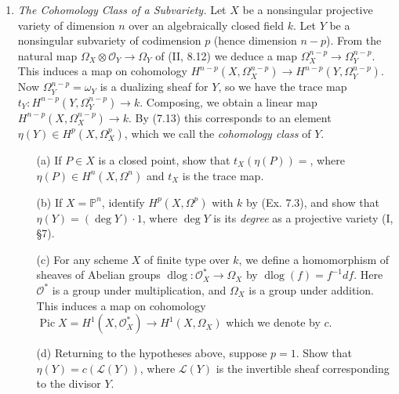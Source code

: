 \documentclass{article}
\newcommand{\fO}{\mathscr{O}}
\newcommand{\fL}{\mathscr{L}}
\newcommand{\PP}{\mathbb{P}}
\DeclareMathOperator{\pic}{Pic}
\DeclareMathOperator{\dlog}{dlog}
\begin{document}
\begin{enumerate} [label=\textbf{\arabic*.}, leftmargin=0em]
\item \textit{The Cohomology Class of a Subvariety.} Let $X$ be a nonsingular projective variety of dimension $n$ over an algebraically closed field $k$. Let $Y$ be a nonsingular subvariety of codimension $p$ (hence dimension $n - p$). From the natural map $\Omega_X \otimes \fO_Y \to \Omega_Y$ of (II, 8.12) we deduce a map $\Omega_X^{n - p} \to \Omega_Y^{n - p}$. This induces a map on cohomology $H^{n - p}(X, \Omega_X^{n - p}) \to H^{n - p}(Y, \Omega_Y^{n - p})$. Now $\Omega_Y^{n - p} = \omega_Y$ is a dualizing sheaf for $Y$, so we have the trace map $t_Y : H^{n - p}(Y, \Omega_Y^{n - p}) \to k$. Composing, we obtain a linear map $H^{n - p}(X, \Omega_X^{n - p}) \to k$. By (7.13) this corresponds to an element $\eta(Y) \in H^p(X, \Omega_X^p)$, which we call the \textit{cohomology class} of $Y$.
\begin{itemize}
  \item[(a)] If $P \in X$ is a closed point, show that $t_X(\eta(P)) = $, where $\eta(P) \in H^n(X, \Omega^n)$ and $t_X$ is the trace map.
  \item[(b)] If $X = \PP^n$, identify $H^p(X, \Omega^p)$ with $k$ by (Ex. 7.3), and show that $\eta(Y) = (\deg Y) \cdot 1$, where $\deg Y$ is its \textit{degree} as a projective variety (I, \S 7).
  \item[(c)] For any scheme $X$ of finite type over $k$, we define a homomorphism of sheaves of Abelian groups $\dlog : \fO_X^* \to \Omega_X$ by $\dlog(f) = f^{-1} df$. Here $\fO^*$ is a group under multiplication, and $\Omega_X$ is a group under addition. This induces a map on cohomology $\pic{X} = H^1(X, \fO_X^*) \to H^1(X, \Omega_X)$ which we denote by $c$.
  \item[(d)] Returning to the hypotheses above, suppose $p = 1$. Show that $\eta(Y) = c(\fL(Y))$, where $\fL(Y)$ is the invertible sheaf corresponding to the divisor $Y$.
\end{itemize}

\end{enumerate}
\end{document}
